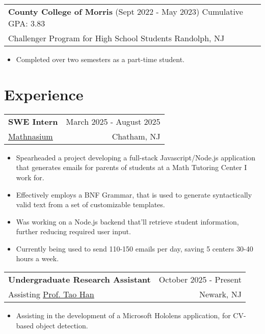 \documentclass{article}
\begin{document}
    \vspace{-15pt}\begin{center}
        \begin{tabular}{p{}}
            {\large \bf County College of Morris} (Sept 2022 - May 2023) \hfill Cumulative GPA: 3.83 \\
            Challenger Program for High School Students \hfill Randolph, NJ
        \end{tabular}
    \end{center}
    \vspace{-10pt}\begin{itemize}
        \item Completed over two semesters as a part-time student.
    \end{itemize}

\section{Experience} \vspace{4pt}
    \raggedright\begin{tabular}{lr}
        \parbox[l]{3.65in}{\bf{\large{SWE Intern}}} &
        \parbox[r]{3.65in}{\raggedleft March 2025 - August 2025} \\
        \parbox[l]{3.65in}{\href{https://www.mathnasium.com/math-centers/chatham}{\underline{Mathnasium}}} &
        \parbox[r]{3.65in}{\raggedleft Chatham, NJ}
    \end{tabular}
    \vspace{-10pt}\begin{itemize} 
        \setlength{\itemsep}{-2pt}
        \item Spearheaded a project developing a full-stack Javascript/Node.js application that generates emails for parents of students at a Math Tutoring Center I work for.
        \item Effectively employs a BNF Grammar, that is used to generate syntactically valid text from a set of customizable templates.
        \item Was working on a Node.js backend that'll retrieve student information, further reducing required user input.
        \item Currently being used to send 110-150 emails per day, saving 5 centers 30-40 hours a week.
    \end{itemize}
    
    \raggedright\begin{tabular}{lr}
        \parbox[l]{3.65in}{\bf{\large{Undergraduate Research Assistant}}} &
        \parbox[r]{3.65in}{\raggedleft October 2025 - Present} \\
        \parbox[l]{3.65in}{Assisting \underline{\href{https://tao-han-njit.netlify.app/}{Prof. Tao Han}}} &
        \parbox[r]{3.65in}{\raggedleft Newark, NJ}
    \end{tabular}
    \vspace{-10pt}\begin{itemize} 
        \setlength{\itemsep}{-2pt}
        \item Assisting in the development of a Microsoft Hololens application, for CV-based object detection.
    \end{itemize}
\end{document}
